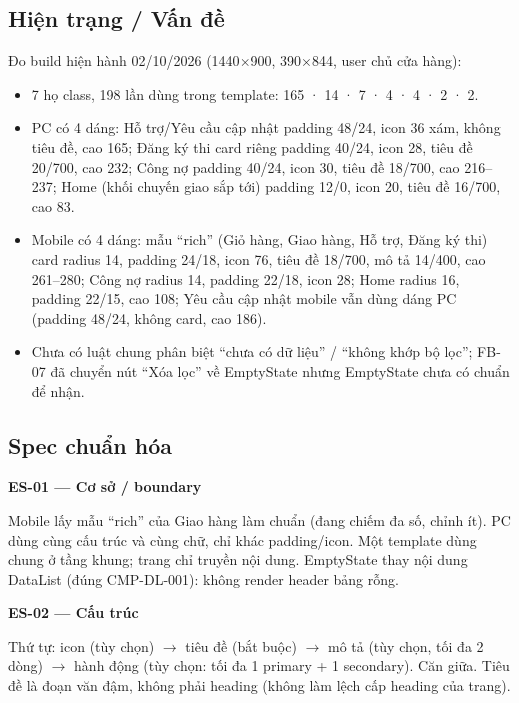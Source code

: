 \documentclass[11pt,a4paper]{report}
\begin{document}
\subsection*{Hiện trạng / Vấn đề}
Đo build hiện hành 02/\allowbreak{}10/\allowbreak{}2026 (1440\(\times\)900, 390\(\times\)844, user chủ cửa hàng):\par
\begin{itemize}
\item 7 họ class, 198 lần dùng trong template:  165 ·  14 ·  7 ·  4 ·  4 ·  2 ·  2.
\item PC có 4 dáng: Hỗ trợ/\allowbreak{}Yêu cầu cập nhật padding 48/\allowbreak{}24, icon 36 xám, không tiêu đề, cao 165; Đăng ký thi card riêng padding 40/\allowbreak{}24, icon 28, tiêu đề 20/\allowbreak{}700, cao 232; Công nợ padding 40/\allowbreak{}24, icon 30, tiêu đề 18/\allowbreak{}700, cao 216–237; Home (khối chuyến giao sắp tới) padding 12/\allowbreak{}0, icon 20, tiêu đề 16/\allowbreak{}700, cao 83.
\item Mobile có 4 dáng: mẫu “rich” (Giỏ hàng, Giao hàng, Hỗ trợ, Đăng ký thi) card radius 14, padding 24/\allowbreak{}18, icon 76, tiêu đề 18/\allowbreak{}700, mô tả 14/\allowbreak{}400, cao 261–280; Công nợ radius 14, padding 22/\allowbreak{}18, icon 28; Home radius 16, padding 22/\allowbreak{}15, cao 108; Yêu cầu cập nhật mobile vẫn dùng dáng PC (padding 48/\allowbreak{}24, không card, cao 186).
\item Chưa có luật chung phân biệt “chưa có dữ liệu” / “không khớp bộ lọc”; FB-07 đã chuyển nút “Xóa lọc” về EmptyState nhưng EmptyState chưa có chuẩn để nhận.
\end{itemize}
\subsection*{Spec chuẩn hóa}
\par\smallskip\textbf{ES-01 — Cơ sở / boundary}\par
Mobile lấy mẫu “rich” của Giao hàng làm chuẩn (đang chiếm đa số, chỉnh ít). PC dùng cùng cấu trúc và cùng chữ, chỉ khác padding/\allowbreak{}icon. Một template dùng chung ở tầng khung; trang chỉ truyền nội dung. EmptyState thay nội dung DataList (đúng CMP-DL-001): không render header bảng rỗng.\par

\par\smallskip\textbf{ES-02 — Cấu trúc}\par
Thứ tự: icon (tùy chọn) \(\to\) tiêu đề (bắt buộc) \(\to\) mô tả (tùy chọn, tối đa 2 dòng) \(\to\) hành động (tùy chọn: tối đa 1 primary + 1 secondary). Căn giữa. Tiêu đề là đoạn văn đậm, không phải heading (không làm lệch cấp heading của trang).\par
\end{document}
